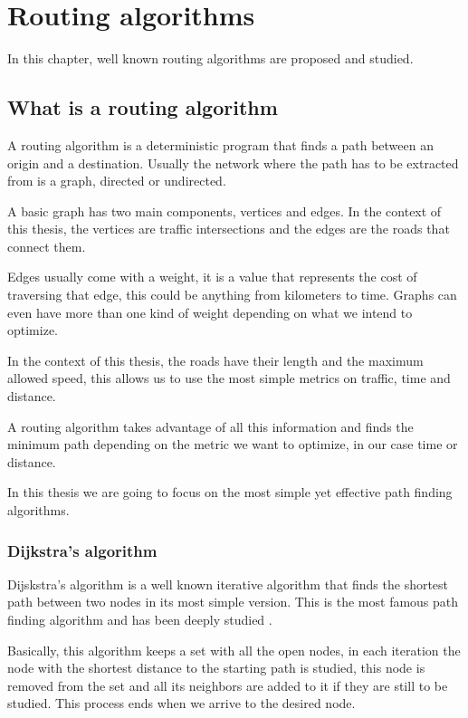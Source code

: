 \chapter{Routing algorithms}

In this chapter, well known routing algorithms are proposed and studied.

\section{What is a routing algorithm}

A routing algorithm is a deterministic program that finds a path between an origin and a destination. Usually the network where the path has to be extracted from is a graph, directed or undirected.

A basic graph has two main components, vertices and edges. In the context of this thesis, the vertices are traffic intersections and the edges are the roads that connect them.

Edges usually come with a weight, it is a value that represents the cost of traversing that edge, this could be anything from kilometers to time. Graphs can even have more than one kind of weight depending on what we intend to optimize.

In the context of this thesis, the roads have their length and the maximum allowed speed, this allows us to use the most simple metrics on traffic, time and distance.

A routing algorithm takes advantage of all this information and finds the minimum path depending on the metric we want to optimize, in our case time or distance.

In this thesis we are going to focus on the most simple yet effective path finding algorithms.

\subsection{Dijkstra's algorithm}

Dijskstra's algorithm is a well known iterative algorithm that finds the shortest path between two nodes in its most simple version. This is the most famous path finding algorithm and has been deeply studied \cite{dijkstra_1} \cite{dijkstra_2}.

Basically, this algorithm keeps a set with all the open nodes, in each iteration the node with the shortest distance to the starting path is studied, this node is removed from the set and all its neighbors are added to it if they are still to be studied. This process ends when we arrive to the desired node. 


